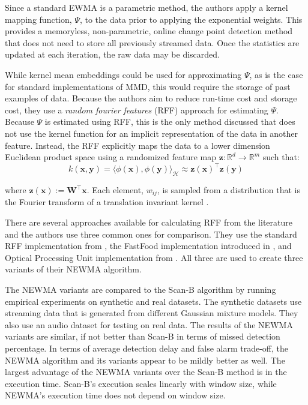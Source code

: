 Since a standard EWMA is a parametric method, the authors apply a kernel mapping function, $\Psi$, to the data prior to applying the exponential weights. This provides a memoryless, non-parametric, online change point detection method that does not need to store all previously streamed data. Once the statistics are updated at each iteration, the raw data may be discarded. %

While kernel mean embeddings could be used for approximating $\Psi$, as is the case for standard implementations of MMD, this would require the storage of past examples of data. Because the authors aim to reduce run-time cost and storage cost, they use a \textit{random fourier features} (RFF) approach for estimating $\Psi$. Because $\Psi$  is estimated using RFF, this is the only method discussed that does not use the kernel function for an implicit representation of the data in another feature. Instead, the RFF explicitly maps the data to a lower dimension Euclidean product space using a randomized feature map $\mathbf{z}: \mathbb{R}^d \rightarrow \mathbb{R}^m$ such that:
\begin{equation}
k(\mathbf{x}, \mathbf{y})=\langle\phi(\mathbf{x}), \phi(\mathbf{y})\rangle_{\mathcal{H}} \approx \mathbf{z}(\mathbf{x})^{\top} \mathbf{z}(\mathbf{y})
\end{equation}

where $\mathbf{z}(\mathbf{x}):=\mathbf{W}^{\top} \mathbf{x}$. Each element, $w_{ij}$, is sampled from a distribution that is the Fourier transform of a translation invariant kernel \cite{rahimi2008random}.

There are several approaches available for calculating RFF from the literature and the authors use three common ones for comparison. They use the standard RFF implementation from \cite{rahimi2008random}, the FastFood implementation introduced in \cite{le2014fastfood}, and Optical Processing Unit implementation from \cite{saade2016random}. All three are used to create three variants of their NEWMA algorithm.

The NEWMA variants are compared to the Scan-B algorithm by running empirical experiments on synthetic and real datasets. The synthetic datasets use streaming data that is generated from different Gaussian mixture models. They also use an audio dataset for testing on real data. The results of the NEWMA variants are similar, if not better than Scan-B in terms of missed detection percentage. In terms of average detection delay and false alarm trade-off, the NEWMA algorithm and its variants appear to be mildly better as well. The largest advantage of the NEWMA variants over the Scan-B method is in the execution time. Scan-B's execution scales linearly with window size, while NEWMA's execution time does not depend on window size.

